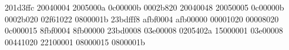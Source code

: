 201d3ffc
20040004
2005000a
0c00000b
0002b820
20040048
20050005
0c00000b
0002b020
02f61022
0800001b
23bdfff8
afbf0004
afb00000
00001020
00008020
0c000015
8fbf0004
8fb00000
23bd0008
03e00008
0205402a
15000001
03e00008
00441020
22100001
08000015
0800001b
